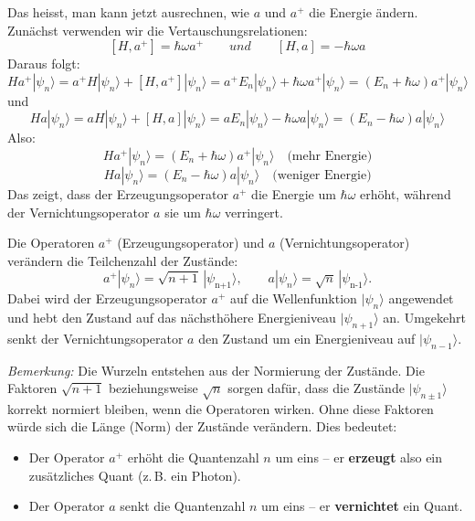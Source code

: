 			Das heisst, man kann jetzt ausrechnen, wie $a$ und $a^+$ die Energie ändern.
			Zunächst verwenden wir die Vertauschungsrelationen:
			\[
				[H, a^+] = \hbar\omega a^+
				\qquad
				und
				\qquad
				[H, a] = -\hbar\omega a
			\]
			Daraus folgt:
			\[
				H a^+ |\psi_n\rangle = a^+ H|\psi_n\rangle + [H, a^+]|\psi_n\rangle = a^+ E_n|\psi_n\rangle + \hbar\omega a^+ |\psi_n\rangle = (E_n + \hbar\omega)a^+|\psi_n\rangle
			\]
			und
			\[
				H a|\psi_n\rangle = a H|\psi_n\rangle + [H, a]|\psi_n\rangle = a E_n|\psi_n\rangle - \hbar\omega a|\psi_n\rangle = (E_n - \hbar\omega)a|\psi_n\rangle
			\]
			Also:
			\begin{equation}
				H a^+ |\psi_n\rangle =  (E_n + \hbar\omega)a^+ |\psi_n\rangle \quad \text{(mehr Energie)}
			\end{equation}
			\begin{equation}
				H a |\psi_n\rangle = (E_n - \hbar\omega)a | \psi_n\rangle \quad \text{(weniger Energie)}
			\end{equation}
			Das zeigt, dass der Erzeugungsoperator $a^+$ die Energie um $\hbar\omega$ erhöht, während der Vernichtungsoperator $a$ sie um $\hbar\omega$ verringert.

			Die Operatoren $a^+$ (Erzeugungsoperator) und $a$ (Vernichtungsoperator) verändern die Teilchenzahl der Zustände:
			\[
				a^+|\psi_n\rangle = \sqrt{n+1}\,|\psi_\text{n+1}\rangle,
				\qquad
				a|\psi_n\rangle = \sqrt{n}\,|\psi_\text{n-1}\rangle.
			\]
			Dabei wird der Erzeugungsoperator $a^+$ auf die Wellenfunktion $|\psi_n\rangle$ angewendet und hebt den Zustand auf das nächsthöhere Energieniveau $|\psi_{n+1}\rangle$ an.
			Umgekehrt senkt der Vernichtungsoperator $a$ den Zustand um ein Energieniveau auf $|\psi_{n-1}\rangle$.
			
			\textit{Bemerkung:} 
			Die Wurzeln entstehen aus der Normierung der Zustände.
			Die Faktoren $\sqrt{n+1}$ beziehungsweise $\sqrt{n}$ sorgen dafür, dass die Zustände $|\psi_{n\pm1}\rangle$ korrekt normiert bleiben, wenn die Operatoren wirken.
			Ohne diese Faktoren würde sich die Länge (Norm) der Zustände verändern.
			Dies bedeutet:
			\begin{itemize}
				\item Der Operator $a^+$ erhöht die Quantenzahl $n$ um eins – er \textbf{erzeugt} also ein zusätzliches Quant (z.\,B. ein Photon).
				\item Der Operator $a$ senkt die Quantenzahl $n$ um eins – er \textbf{vernichtet} ein Quant.
			\end{itemize}

